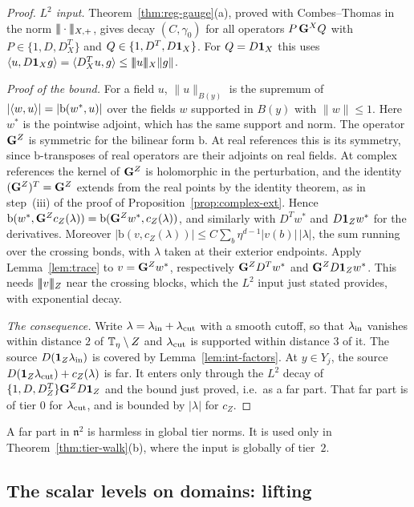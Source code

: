 \begin{proof}
\emph{$L^2$ input.} Theorem~\ref{thm:reg-gauge}(a), proved with Combes--Thomas in the norm $|\!|\!|\cdot|\!|\!|_{X,+}$, gives decay $(C,\gamma_0)$ for all operators $P\,\mathbf G^X Q$ with $P\in\{1,D,D^T_X\}$ and $Q\in\{1,D^T,D\mathbf 1_X\}$. For $Q=D\mathbf 1_X$ this uses $\langle u,D\mathbf 1_Xg\rangle=\langle D^T_Xu,g\rangle\le|\!|\!|u|\!|\!|_X\|g\|$.

\emph{Proof of the bound.} For a field $u$, $\|u\|_{B(y)}$ is the supremum of $|\langle w,u\rangle|=|\mathrm b(w^*,u)|$ over the fields $w$ supported in $B(y)$ with $\|w\|\le1$. Here $w^*$ is the pointwise adjoint, which has the same support and norm. The operator $\mathbf G^Z$ is symmetric for the bilinear form $\mathrm b$. At real references this is its symmetry, since $\mathrm b$-transposes of real operators are their adjoints on real fields. At complex references the kernel of $\mathbf G^Z$ is holomorphic in the perturbation, and the identity $(\mathbf G^Z)^T=\mathbf G^Z$ extends from the real points by the identity theorem, as in step~(iii) of the proof of Proposition~\ref{prop:complex-ext}. Hence $\mathrm b(w^*,\mathbf G^Zc_Z(\lambda))=\mathrm b(\mathbf G^Zw^*,c_Z(\lambda))$, and similarly with $D^Tw^*$ and $D\mathbf 1_Zw^*$ for the derivatives. Moreover $|\mathrm b(v,c_Z(\lambda))|\le C\sum_b\eta^{d-1}|v(b)|\,|\lambda|$, the sum running over the crossing bonds, with $\lambda$ taken at their exterior endpoints. Apply Lemma~\ref{lem:trace} to $v=\mathbf G^Zw^*$, respectively $\mathbf G^ZD^Tw^*$ and $\mathbf G^ZD\mathbf 1_Zw^*$. This needs $|\!|\!|v|\!|\!|_Z$ near the crossing blocks, which the $L^2$ input just stated provides, with exponential decay.

\emph{The consequence.} Write $\lambda=\lambda_{\rm in}+\lambda_{\rm cut}$ with a smooth cutoff, so that $\lambda_{\rm in}$ vanishes within distance $2$ of $\mathbb T_\eta\setminus Z$ and $\lambda_{\rm cut}$ is supported within distance $3$ of it. The source $D(\mathbf 1_Z\lambda_{\rm in})$ is covered by Lemma~\ref{lem:int-factors}. At $y\in Y_j$, the source $D(\mathbf 1_Z\lambda_{\rm cut})+c_Z(\lambda)$ is far. It enters only through the $L^2$ decay of $\{1,D,D^T_Z\}\mathbf G^ZD\mathbf 1_Z$ and the bound just proved, i.e.\ as a far part. That far part is of tier $0$ for $\lambda_{\rm cut}$, and is bounded by $|\lambda|$ for $c_Z$.
\end{proof}

A far part in $\mathfrak n^2$ is harmless in global tier norms. It is used only in Theorem~\ref{thm:tier-walk}(b), where the input is globally of tier~$2$.

\subsection{The scalar levels on domains: lifting}

